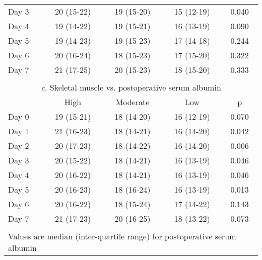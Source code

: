 \begin{table}[p]
\begin{tabular}{|l c c c c |}
		Day 3 & 20 (15-22) & 19 (15-20) & 15 (12-19) & 0.040                                         \\
		Day 4 & 19 (14-22) & 19 (15-21) & 16 (13-19) & 0.090                                         \\
		Day 5 & 19 (14-23) & 19 (15-23) & 17 (14-18) & 0.244                                         \\
		Day 6 & 20 (16-24) & 18 (15-23) & 17 (15-20) & 0.322                                         \\
		Day 7 & 21 (17-25) & 20 (15-23) & 18 (15-20) & 0.333                                         \\ \hline
		                                    \multicolumn{5}{c}{}                                     \\
		      \multicolumn{5}{c}{\textit{c.} Skeletal muscle vs. postoperative serum albumin}        \\ \hline
		      & High       & Moderate   & Low        & p                                             \\
		Day 0 & 19 (15-21) & 18 (14-20) & 16 (12-19) & 0.070                                         \\
		Day 1 & 21 (16-23) & 18 (14-21) & 16 (14-20) & 0.042                                         \\
		Day 2 & 20 (17-23) & 18 (14-22) & 16 (14-20) & 0.006                                         \\
		Day 3 & 20 (15-22) & 18 (14-21) & 16 (13-19) & 0.046                                         \\
		Day 4 & 20 (16-22) & 18 (14-21) & 16 (13-19) & 0.046                                         \\
		Day 5 & 20 (16-23) & 18 (16-24) & 16 (13-19) & 0.013                                         \\
		Day 6 & 20 (16-22) & 18 (15-24) & 17 (14-22) & 0.143                                         \\
		Day 7 & 21 (17-23) & 20 (16-25) & 18 (13-22) & 0.073                                         \\ \hline
		                                    \multicolumn{5}{c}{}                                     \\
		\multicolumn{5}{l}{Values are median (inter-quartile range) for postoperative serum albumin}
	\end{tabular}	
\end{table}

		  